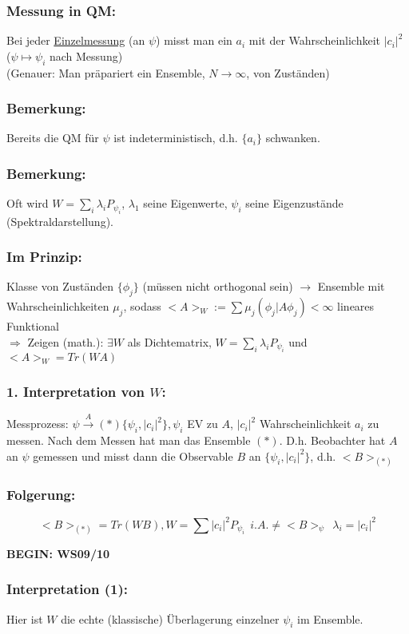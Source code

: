 \documentclass[twoside,a4paper]{scrartcl}
\renewcommand{\1}{\mathds{1}}
\newcommand{\Ra}{\Rightarrow}
\newcommand{\ra}{\rightarrow}
\renewcommand{\l}{\lambda}
\begin{document}
\subsubsection*{Messung in QM:}
Bei jeder \underline{Einzelmessung} (an $\psi$) misst man ein $a_i$ mit der Wahrscheinlichkeit $|c_i|^2$ ($\psi \mapsto \psi_i$ nach Messung)\\
(Genauer: Man präpariert ein Ensemble, $N \ra \infty$, von Zuständen)
\subsubsection*{Bemerkung:}
Bereits die QM für $\psi$ ist indeterministisch, d.h. $\{a_i\}$ schwanken.
\subsubsection*{Bemerkung:}
Oft wird $W=\sum_i \l_i P_{\psi_i}$, $\l_1$ seine Eigenwerte, $\psi_i$ seine Eigenzustände (Spektraldarstellung).
\subsubsection*{Im Prinzip:}
Klasse von Zuständen $\{\phi_j\}$ (müssen nicht orthogonal sein) $\ra$ Ensemble mit Wahrscheinlichkeiten $\mu_j$, sodass $<A>_W:= \sum \mu_j (\phi_j|A\phi_j)<\infty$ lineares Funktional\\
$\Ra$ Zeigen (math.): $\exists W$ als Dichtematrix, $W=\sum_i \l_i P_{\psi_i}$ und $<A>_W=Tr(WA)$
\subsubsection*{1. Interpretation von $W$:}
Messprozess: $\psi \stackrel{A}{\ra} (*)\{\psi_i,|c_i|^2\}, \psi_i$ EV zu $A$, $|c_i|^2$ Wahrscheinlichkeit $a_i$ zu messen. Nach dem Messen hat man das Ensemble $(*)$. D.h. Beobachter hat $A$ an $\psi$ gemessen und misst dann die Observable $B$ an $\{\psi_i,|c_i|^2\}$, d.h. $<B>_{(*)}$
\subsubsection*{Folgerung:}
$$<B>_{(*)}=Tr(WB), W=\sum |c_i|^2 P_{\psi_i} \ \  i.A. \neq <B>_\psi  \ \ \l_i=|c_i|^2$$

\textbf{BEGIN: WS09/10}
\subsubsection*{Interpretation (1):}
Hier ist $W$ die echte (klassische) Überlagerung einzelner $\psi_i$ im Ensemble.
\end{document}
